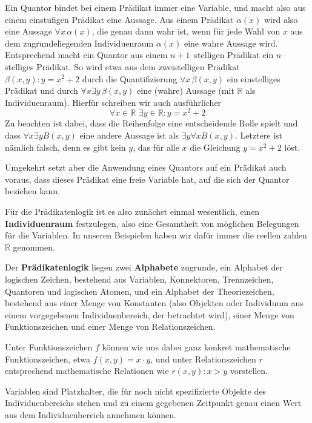 Ein Quantor bindet bei einem Prädikat immer eine Variable, und macht also aus einem einstufigen Prädikat eine 
Aussage. Aus einem Prädikat $\alpha(x)$ wird also eine Aussage $\forall x \, \alpha(x)$, die genau dann wahr ist, 
wenn für jede Wahl von $x$ aus dem zugrundeliegenden Individuenraum $\alpha(x)$ eine wahre Aussage wird. 
Entsprechend macht ein Quantor aus einem $n+1$--stelligen Prädikat ein $n$--stelliges Prädikat. So wird etwa 
aus dem zweistelligen Prädikat $\beta(x,y) : y = x^2 + 2$ durch die Quantifizierung $\forall x \, \beta(x,y)$ ein 
einstelliges Prädikat und durch $\forall x \exists y \, \beta(x,y)$ eine (wahre) Aussage (mit $\mathbb R$ als  
Individuenraum). Hierfür schreiben wir auch ausführlicher
  	$$ \forall x \in \mathbb R \,\, \exists y \in \mathbb R : y = x^2 + 2 $$
Zu beachten ist dabei, dass die Reihenfolge eine entscheidende Rolle spielt und dass
$\forall x \exists y B(x,y)$ eine andere Aussage ist als $\exists y \forall x B(x,y)$. 
Letztere ist nämlich falsch, denn es gibt kein $y$, das für alle $x$ die Gleichung $y = x^2 + 2$ löst. 

Umgekehrt setzt aber die Anwendung eines Quantors auf ein Prädikat auch voraus, dass dieses Prädikat 
eine freie Variable hat, auf die sich der Quantor beziehen kann.

Für die Prädikatenlogik ist es also zunächst einmal wesentlich, einen \textbf{Individuenraum} festzulegen, 
also eine Gesamtheit von möglichen Belegungen für die Variablen. In unseren Beispielen haben wir dafür immer 
die reellen zahlen $\mathbb R$ genommen.

Der \textbf{Prädikatenlogik} liegen zwei \textbf{Alphabete} 
zugrunde, ein Alphabet der logischen Zeichen, bestehend aus 
Variablen, Konnektoren, Trennzeichen, Quantoren und logischen Atomen, und ein Alphabet der Theoriezeichen, 
bestehend aus einer Menge von Konstanten (also Objekten oder Individuum aus einem vorgegebenen 
Individuenbereich, der betrachtet wird), einer Menge von Funktionszeichen und einer Menge von Relationszeichen. 

Unter Funktionszeichen $f$ können wir uns dabei ganz konkret mathematische Funktionszeichen, etwa $f(x, y) = 
x \cdot y$, und unter Relationszeichen $r$ entsprechend mathematische Relationen wie $r(x,y) : x > y$ vorstellen.

Variablen sind Platzhalter, die für noch nicht spezifizierte Objekte des Individuenbereichs stehen und zu 
einem gegebenen Zeitpunkt genau einen Wert aus dem Individuenbereich annehmen können. 

